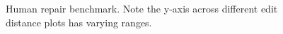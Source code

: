 \documentclass[11pt]{article}
\begin{document}
  \begin{figure}[H]
    \resizebox{.24\textwidth}{!}{}
    \resizebox{.24\textwidth}{!}{}
    \resizebox{.24\textwidth}{!}{}
    \resizebox{.24\textwidth}{!}{}
    \caption{Human repair benchmark. Note the y-axis across different edit distance plots has varying ranges.}\label{fig:human}
  \end{figure}
\end{document}
